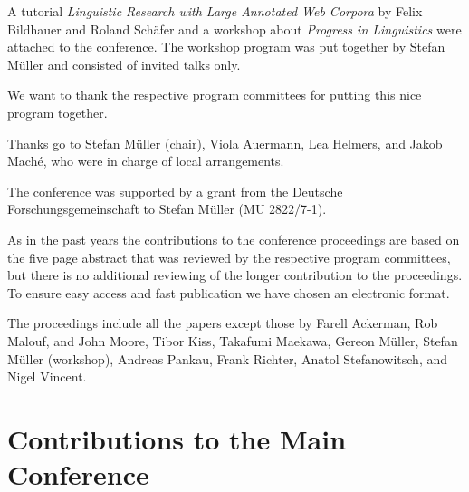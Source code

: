 \documentclass[11pt,a4paper,fleqn]{article}
\begin{document}
A tutorial \emph{Linguistic Research with Large Annotated Web Corpora} by Felix Bild\-hauer
and Roland Schäfer and a workshop about \emph{Progress in Linguistics}
were attached to the conference. The workshop program was put together by Stefan Müller and consisted of
invited talks only.

We want to thank the respective program committees for putting this nice program together.

Thanks go to Stefan Müller (chair), Viola Auermann, Lea Helmers, and Jakob Maché, who were
in charge of local arrangements.
 
The conference was supported by a grant from the Deutsche Forschungsgemeinschaft to Stefan Müller (MU 2822/7-1).

As in the past years the contributions to the conference proceedings are based on the five page abstract
that was reviewed by the respective program committees, but there is no additional reviewing of the
longer contribution to the proceedings.
To ensure easy access and fast publication we have chosen an electronic format.

The proceedings include all the papers except those by  Farell Ackerman, Rob Malouf, and John Moore,
Tibor Kiss, Takafumi Maekawa, Gereon Müller, Stefan Müller (workshop), Andreas Pankau, Frank
Richter, Anatol Stefanowitsch, and Nigel Vincent.



\newpage
\part{Contributions to the Main Conference}
\thispagestyle{empty}
\newpage
        \setcounter{page}{6}
\thispagestyle{empty}
\end{document}
